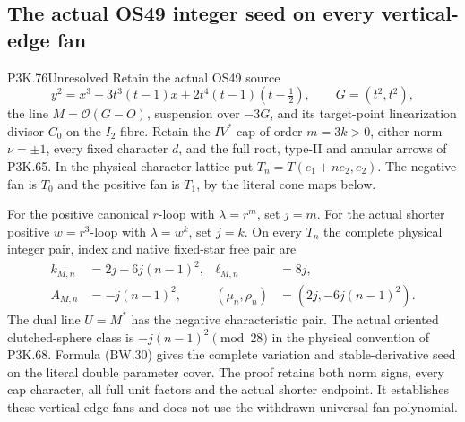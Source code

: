 \subsection{The actual OS49 integer seed on every vertical-edge fan}
\begin{statement}{P3K.76}{Unresolved}
Retain the actual OS49 source
\[
y^2=x^3-3t^3(t-1)x+2t^4(t-1)(t-\tfrac12),\qquad G=(t^2,t^2),
\]
the line \(M=\mathcal O(G-O)\), suspension over \(-3G\), and
its target-point linearization divisor \(C_0\) on the \(I_2\) fibre.
Retain the \(IV^*\) cap of order \(m=3k>0\), either norm
\(\nu=\pm1\), every fixed character \(d\), and the full root,
type-II and annular arrows of P3K.65. In the physical character
lattice put \(T_n=T(e_1+ne_2,e_2)\). The negative fan is \(T_0\)
and the positive fan is \(T_1\), by the literal cone maps below.

For the positive canonical \(r\)-loop with \(\lambda=r^m\), set
\(j=m\). For the actual shorter positive \(w=r^3\)-loop with
\(\lambda=w^k\), set \(j=k\). On every \(T_n\) the complete
physical integer pair, index and native fixed-star free pair are
\[
\begin{aligned}
k_{M,n}&=2j-6j(n-1)^2,&\ell_{M,n}&=8j,\\
A_{M,n}&=-j(n-1)^2,&
(\mu_n,\rho_n)&=(2j,-6j(n-1)^2).
\end{aligned}
\]
The dual line \(U=M^*\) has the negative characteristic pair.
The actual oriented clutched-sphere class is
\(-j(n-1)^2\pmod {28}\) in the physical convention of P3K.68.
Formula (BW.30) gives the complete variation and stable-derivative
seed on the literal double parameter cover. The proof retains
both norm signs, every cap character, all full unit factors and
the actual shorter endpoint. It establishes these vertical-edge
fans and does not use the withdrawn universal fan polynomial.
\end{statement}

